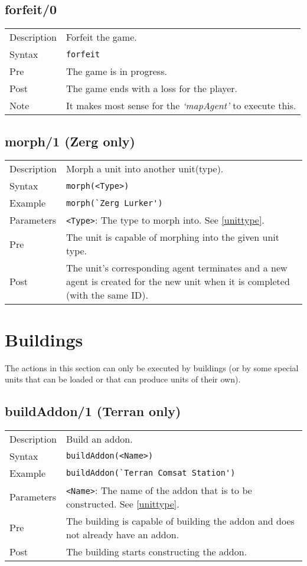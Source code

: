 \subsection{forfeit/0}
\begin{tabularx}{\textwidth}{lX}
 Description & Forfeit the game. \\
 Syntax & \verb|forfeit| \\
 Pre & The game is in progress. \\
 Post & The game ends with a loss for the player. \\
 Note & It makes most sense for the \textit{`mapAgent'} to execute this.
\end{tabularx}

\subsection{morph/1 (Zerg only)}
\begin{tabularx}{\textwidth}{lX}
 Description & Morph a unit into another unit(type). \\
 Syntax & \verb|morph(<Type>)| \\
 Example & \verb|morph(`Zerg Lurker')| \\
 Parameters & \verb|<Type>|: The type to morph into. See \ref{unittype}. \\
 Pre & The unit is capable of morphing into the given unit type. \\
 Post & The unit's corresponding agent terminates and a new agent is created for the new unit when it is completed (with the same ID).
\end{tabularx}

\newpage

\section{Buildings}
The actions in this section can only be executed by buildings (or by some special units that can be loaded or that can produce units of their own).

\subsection{buildAddon/1 (Terran only)}
\begin{tabularx}{\textwidth}{lX}
 Description & Build an addon. \\
 Syntax & \verb|buildAddon(<Name>)| \\
 Example & \verb|buildAddon(`Terran Comsat Station')| \\
 Parameters & \verb|<Name>|: The name of the addon that is to be constructed. See \ref{unittype}. \\
 Pre & The building is capable of building the addon and does not already have an addon. \\
 Post & The building starts constructing the addon.
\end{tabularx}

